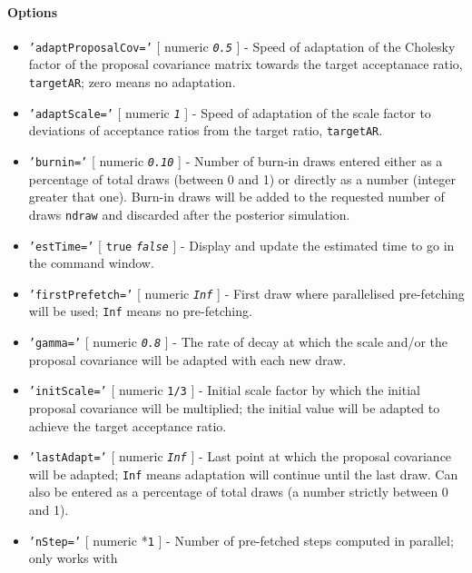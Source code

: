 \paragraph{Options}\label{options}

\begin{itemize}
\item
  \texttt{'adaptProposalCov='} {[} numeric \textbar{}
  \emph{\texttt{0.5}} {]} - Speed of adaptation of the Cholesky factor
  of the proposal covariance matrix towards the target acceptanace
  ratio, \texttt{targetAR}; zero means no adaptation.
\item
  \texttt{'adaptScale='} {[} numeric \textbar{} \emph{\texttt{1}} {]} -
  Speed of adaptation of the scale factor to deviations of acceptance
  ratios from the target ratio, \texttt{targetAR}.
\item
  \texttt{'burnin='} {[} numeric \textbar{} \emph{\texttt{0.10}} {]} -
  Number of burn-in draws entered either as a percentage of total draws
  (between 0 and 1) or directly as a number (integer greater that one).
  Burn-in draws will be added to the requested number of draws
  \texttt{ndraw} and discarded after the posterior simulation.
\item
  \texttt{'estTime='} {[} \texttt{true} \textbar{} \emph{\texttt{false}}
  {]} - Display and update the estimated time to go in the command
  window.
\item
  \texttt{'firstPrefetch='} {[} numeric \textbar{} \emph{\texttt{Inf}}
  {]} - First draw where parallelised pre-fetching will be used;
  \texttt{Inf} means no pre-fetching.
\item
  \texttt{'gamma='} {[} numeric \textbar{} \emph{\texttt{0.8}} {]} - The
  rate of decay at which the scale and/or the proposal covariance will
  be adapted with each new draw.
\item
  \texttt{'initScale='} {[} numeric \textbar{} \texttt{1/3} {]} -
  Initial scale factor by which the initial proposal covariance will be
  multiplied; the initial value will be adapted to achieve the target
  acceptance ratio.
\item
  \texttt{'lastAdapt='} {[} numeric \textbar{} \emph{\texttt{Inf}} {]} -
  Last point at which the proposal covariance will be adapted;
  \texttt{Inf} means adaptation will continue until the last draw. Can
  also be entered as a percentage of total draws (a number strictly
  between 0 and 1).
\item
  \texttt{'nStep='} {[} numeric \textbar{} *\texttt{1} {]} - Number of
  pre-fetched steps computed in parallel; only works with

\end{itemize}
